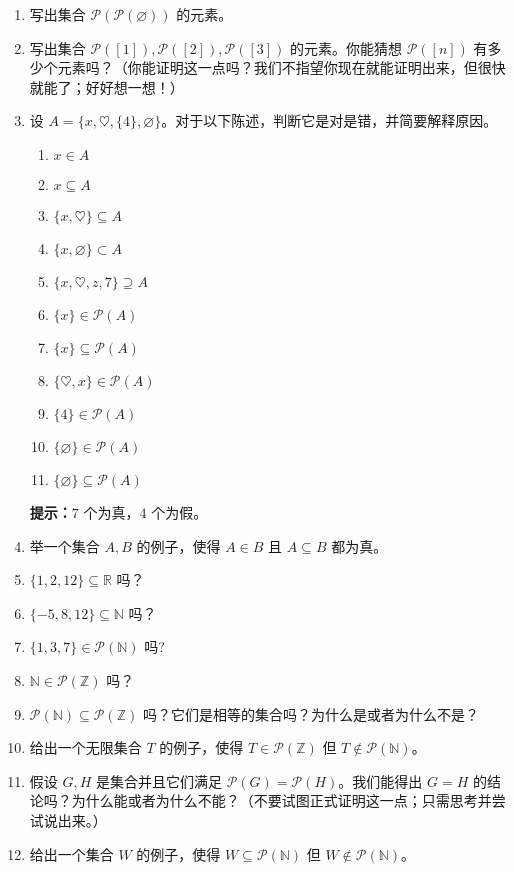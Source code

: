 \begin{enumerate}[label=(\arabic*)]
    \item 写出集合 $\mathcal{P}(\mathcal{P}(\varnothing))$ 的元素。
    \item 写出集合 $\mathcal{P}([1]), \mathcal{P}([2]), \mathcal{P}([3])$ 的元素。你能猜想 $\mathcal{P}([n])$ 有多少个元素吗？（你能证明这一点吗？我们不指望你现在就能证明出来，但很快就能了；好好想一想！）
    \item 设 $A = \{x, \heartsuit, \{4\} , \varnothing\}$。对于以下陈述，判断它是对是错，并简要解释原因。
        \begin{enumerate}[label=(\alph*)]
            \item $x \in A$
            \item $x \subseteq A$
            \item $\{x, \heartsuit\} \subseteq A$
            \item $\{x, \varnothing\} \subset A$
            \item $\{x, \heartsuit, z, 7\} \supseteq A$
            \item $\{x\} \in \mathcal{P}(A)$
            \item $\{x\} \subseteq \mathcal{P}(A)$
            \item $\{\heartsuit, x\} \in \mathcal{P}(A)$
            \item $\{4\} \in \mathcal{P}(A)$
            \item $\{\varnothing\} \in \mathcal{P}(A)$
            \item $\{\varnothing\} \subseteq \mathcal{P}(A)$
        \end{enumerate}
        \textbf{提示：}$7$ 个为真，$4$ 个为假。
    \item 举一个集合 $A, B$ 的例子，使得 $A \in B$ 且 $A \subseteq B$ 都为真。
    \item $\{1, 2, 12\} \subseteq \mathbb{R}$ 吗？
    \item $\{-5, 8, 12\} \subseteq \mathbb{N}$ 吗？
    \item $\{1, 3, 7\} \in \mathcal{P}(\mathbb{N})$ 吗?
    \item $\mathbb{N} \in \mathcal{P}(\mathbb{Z})$ 吗？
    \item $\mathcal{P}(\mathbb{N}) \subseteq \mathcal{P}(\mathbb{Z})$ 吗？它们是相等的集合吗？为什么是或者为什么不是？
    \item 给出一个无限集合 $T$ 的例子，使得 $T \in \mathcal{P}(\mathbb{Z})$ 但 $T \notin \mathcal{P}(\mathbb{N})$。
    \item 假设 $G, H$ 是集合并且它们满足 $\mathcal{P}(G) = \mathcal{P}(H)$。我们能得出 $G = H$ 的结论吗？为什么能或者为什么不能？（不要试图正式证明这一点；只需思考并尝试说出来。）
    \item 给出一个集合 $W$ 的例子，使得 $W \subseteq \mathcal{P}(\mathbb{N})$ 但 $W \notin \mathcal{P}(\mathbb{N})$。
\end{enumerate}
